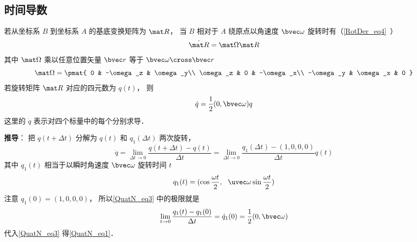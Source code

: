 \subsection{时间导数}
若从坐标系 $B$ 到坐标系 $A$ 的基底变换矩阵为 $\mat R$， 当 $B$ 相对于 $A$ 绕原点以角速度 $\bvec \omega$ 旋转时有（\autoref{RotDer_eq4}~）
\begin{equation}
\dot{\mat R} = \mat \Omega \mat R
\end{equation}
其中 $\mat\Omega$ 乘以任意位置矢量 $\bvec r$ 等于 $\bvec \omega \cross \bvec r$
\begin{equation}
\mat \Omega = \pmat{
0 & -\omega_z & \omega_y\\
\omega_z & 0 & -\omega_x\\
-\omega_y & \omega_x & 0
}\end{equation}
若旋转矩阵 $\mat R$ 对应的四元数为 $q(t)$， 则
\begin{equation}\label{QuatN_eq1}
\dot {q} = \frac12 (0, \bvec \omega) q
\end{equation}
这里的 $\dot{q}$ 表示对四个标量中的每个分别求导．

\textbf{推导}： 把 ${q}(t+\Delta t)$ 分解为 ${q}(t)$ 和 ${q}_1(\Delta t)$ 两次旋转， 
\begin{equation}\label{QuatN_eq3}
\dot {q}
= \lim_{\Delta t\to 0}\frac{{q}(t+\Delta t) - {q}(t)}{\Delta t}
= \lim_{\Delta t\to 0}\frac{{q}_1(\Delta t) - (1,0,0,0)}{\Delta t}q(t)
\end{equation}
其中 ${q}_1(t)$ 相当于以瞬时角速度 $\bvec \omega$ 旋转时间 $t$
\begin{equation}
{q_1}(t) = (\cos\frac{\omega t}{2},\ \ \uvec \omega \sin\frac{\omega t}{2})
\end{equation}
注意 $q_1(0) = (1,0,0,0)$， 所以\autoref{QuatN_eq3} 中的极限就是
\begin{equation}
\lim_{t\to 0}\frac{{q}_1(t) - {q}_1(0)}{\Delta t} = \dot{q}_1(0) = \frac{1}{2}(0, \bvec\omega)
\end{equation}
代入\autoref{QuatN_eq3} 得\autoref{QuatN_eq1}．
